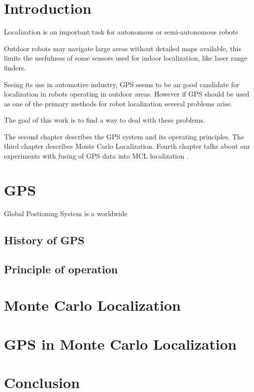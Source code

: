 \documentclass[11pt,notitlepage,a4paper,pdftex]{memoir}
\begin{document}
\chapter{Introduction}

Localization is an important task for autonomous or semi-autonomous robots

Outdoor robots may navigate large areas without detailed maps available, this limits
the usefulness of some sensors used for indoor localization, like laser range finders.

Seeing its use in automotive industry, GPS seems to be an good candidate for
localization in robots operating in outdoor areas.
However if GPS should be used as one of the primary methods for robot localization
several problems arise. 

The goal of this work is to find a way to deal with these problems.

The second chapter describes the GPS system and its operating principles.
The third chapter describes  Monte Carlo Localization.
Fourth chapter talks about  our  experiments
with fusing of GPS data into MCL localization .

\chapter{GPS}

Global Postioning System is a worldwide

\section{History of GPS}

\section{Principle of operation}


\chapter{Monte Carlo Localization}

\chapter{GPS in Monte Carlo Localization}

\chapter{Conclusion}
\end{document}
